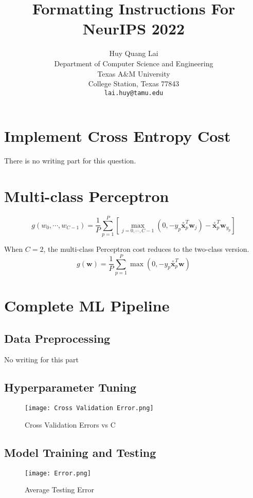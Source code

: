 \documentclass{article}
\title{Formatting Instructions For NeurIPS 2022}
\author{
    Huy Quang Lai \\
    Department of Computer Science and Engineering\\
    Texas A\&M University\\
    College Station, Texas 77843 \\
    \texttt{lai.huy@tamu.edu} \\
}
\begin{document}
\maketitle

\section{Implement Cross Entropy Cost}

There is no writing part for this question.

\section{Multi-class Perceptron}
\[g(w_0,\cdots,w_{C-1})=\frac{1}{P}\sum_{p=1}^{P}\left[\max_{j=0,\cdots,C-1}\left(0,-y_p \overset{\circ}{\textbf{x}}_p^T \textbf{w}_j\right)-\overset{\circ}{\textbf{x}}_p^T\textbf{w}_{y_p}\right]\]

When $C=2$, the multi-class Perceptron cost reduces to the two-class version.
\[g(\textbf{w})=\frac{1}{P}\sum_{p=1}^{P}\max\left(0,-y_p\overset{\circ}{\textbf{x}}_p^T\textbf{w}\right)\]

\clearpage
\section{Complete ML Pipeline}
\subsection{Data Preprocessing}
No writing for this part

\subsection{Hyperparameter Tuning}
\begin{figure}[!ht]
    \centering
    \texttt{[image: Cross Validation Error.png]}
    \caption{Cross Validation Errors vs C}
\end{figure}

\clearpage
\subsection{Model Training and Testing}
\begin{figure}[!ht]
    \centering
    \texttt{[image: Error.png]}
    \caption{Average Testing Error}
\end{figure}

\clearpage
\end{document}
